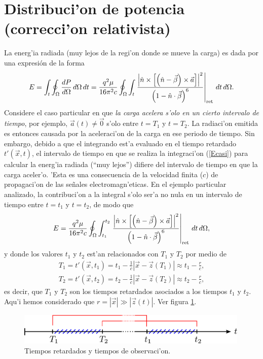 \section{Distribuci'on de potencia (correcci'on relativista)}
La energ'ia radiada (muy lejos de la regi'on donde se mueve la carga) es dada por una expresión de la forma
\begin{equation}
 E=\int_t\oint_\Omega \frac{dP}{d\Omega}\,d\Omega\,dt=\frac{q^2\mu}{16\pi^2 c}\oint_\Omega\int_t\left.\frac{\left|\hat{n}\times
\left[ \left( \hat{n}-\vec{\beta}\right)\times{\vec{a}}\right]\right|^2}{\left(
1-\hat{n}\cdot\vec{\beta}\right) ^{6}}\right|_{\rm ret}\,dt\,d\Omega .
\end{equation}
Considere el caso particular en que \textit{la carga acelera s'olo en un cierto intervalo de tiempo}, por ejemplo, $\vec{a}(t)\neq\vec{0}$ s'olo entre $t=T_1$ y $t=T_2$. La radiaci'on emitida es entonces causada por la aceleraci'on de la carga en ese periodo de tiempo. Sin embargo, debido a que el integrando est'a evaluado en el tiempo retardado $t'(\vec{x},t)$, el intervalo de tiempo en que se realiza la integraci'on (\ref{Ecasi}) para calcular la energ'ia radiada  (``muy lejos'') difiere del intervalo de tiempo en que la carga aceler'o. 'Esta es una consecuencia de la velocidad finita ($c$) de propagaci'on de las señales electromagn'eticas. En el ejemplo particular analizado, la contribuci'on a la integral s'olo ser'a no nula en un intervalo de tiempo entre $t=t_1$ y $t=t_2$, de modo que
\begin{equation}
 E=\frac{q^2\mu}{16\pi^2 c}\oint_\Omega\int_{t_1}^{t_2}\left.\frac{\left|\hat{n}\times
\left[ \left( \hat{n}-\vec{\beta}\right)\times{\vec{a}}\right]\right|^2}{\left(
1-\hat{n}\cdot\vec{\beta}\right) ^{6}}\right|_{\rm ret}\,dt\,d\Omega , \label{Ecasi}
\end{equation}
y donde los valores $t_1$ y $t_2$ est'an relacionados con $T_1$ y $T_2$ por medio de
\begin{eqnarray}
T_1=t'(\vec{x},t_1)=t_1-\frac{1}{c}|\vec{x}-\vec{z}(T_1)|
\approx t_1-\frac{r}{c}, \\
T_2=t'(\vec{x},t_2)=t_2-\frac{1}{c}|\vec{x}-\vec{z}(T_2)|
\approx t_2-\frac{r}{c},
\end{eqnarray}
es decir, que $T_1$ y $T_2$ son los tiempos retardados asociados a los tiempos $t_1$ y $t_2$. Aqu'i hemos considerado que $r=|\vec{x}|\gg |\vec{z}(t)|$. Ver figura \ref{fig:tiempos}.
\begin{figure}[H]
\centerline{\includegraphics[height=1.5cm]{fig/fig-tiempos.pdf}}
\caption{Tiempos retardados y tiempos de observaci'on.}
\label{fig:tiempos}
\end{figure}

